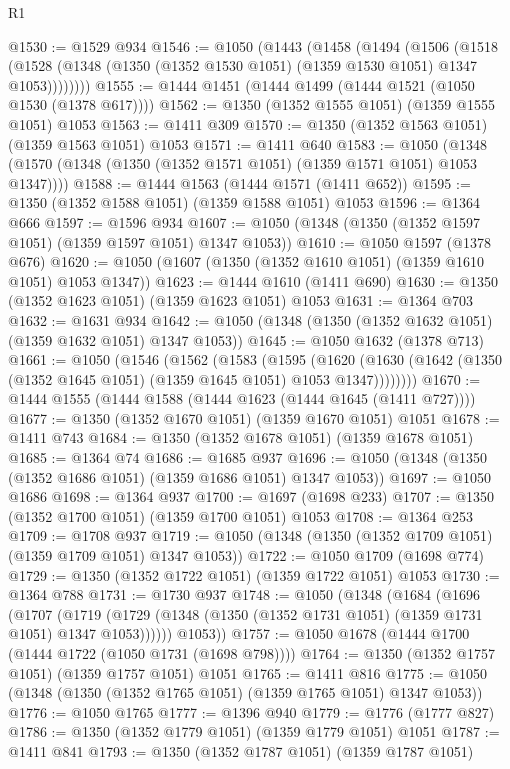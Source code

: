 \begin{lexlean}{R1}
\begin{coremodule}
@1530 := @1529 @934
@1546 := @1050
    (@1443
      (@1458
        (@1494
          (@1506
            (@1518 (@1528 (@1348 (@1350 (@1352 @1530 @1051) (@1359 @1530 @1051) @1347 @1053))))))))
@1555 := @1444 @1451 (@1444 @1499 (@1444 @1521 (@1050 @1530 (@1378 @617))))
@1562 := @1350 (@1352 @1555 @1051) (@1359 @1555 @1051) @1053
@1563 := @1411 @309
@1570 := @1350 (@1352 @1563 @1051) (@1359 @1563 @1051) @1053
@1571 := @1411 @640
@1583 := @1050 (@1348 (@1570 (@1348 (@1350 (@1352 @1571 @1051) (@1359 @1571 @1051) @1053 @1347))))
@1588 := @1444 @1563 (@1444 @1571 (@1411 @652))
@1595 := @1350 (@1352 @1588 @1051) (@1359 @1588 @1051) @1053
@1596 := @1364 @666
@1597 := @1596 @934
@1607 := @1050 (@1348 (@1350 (@1352 @1597 @1051) (@1359 @1597 @1051) @1347 @1053))
@1610 := @1050 @1597 (@1378 @676)
@1620 := @1050 (@1607 (@1350 (@1352 @1610 @1051) (@1359 @1610 @1051) @1053 @1347))
@1623 := @1444 @1610 (@1411 @690)
@1630 := @1350 (@1352 @1623 @1051) (@1359 @1623 @1051) @1053
@1631 := @1364 @703
@1632 := @1631 @934
@1642 := @1050 (@1348 (@1350 (@1352 @1632 @1051) (@1359 @1632 @1051) @1347 @1053))
@1645 := @1050 @1632 (@1378 @713)
@1661 := @1050
    (@1546
      (@1562
        (@1583
          (@1595
            (@1620 (@1630 (@1642 (@1350 (@1352 @1645 @1051) (@1359 @1645 @1051) @1053 @1347))))))))
@1670 := @1444 @1555 (@1444 @1588 (@1444 @1623 (@1444 @1645 (@1411 @727))))
@1677 := @1350 (@1352 @1670 @1051) (@1359 @1670 @1051) @1051
@1678 := @1411 @743
@1684 := @1350 (@1352 @1678 @1051) (@1359 @1678 @1051)
@1685 := @1364 @74
@1686 := @1685 @937
@1696 := @1050 (@1348 (@1350 (@1352 @1686 @1051) (@1359 @1686 @1051) @1347 @1053))
@1697 := @1050 @1686
@1698 := @1364 @937
@1700 := @1697 (@1698 @233)
@1707 := @1350 (@1352 @1700 @1051) (@1359 @1700 @1051) @1053
@1708 := @1364 @253
@1709 := @1708 @937
@1719 := @1050 (@1348 (@1350 (@1352 @1709 @1051) (@1359 @1709 @1051) @1347 @1053))
@1722 := @1050 @1709 (@1698 @774)
@1729 := @1350 (@1352 @1722 @1051) (@1359 @1722 @1051) @1053
@1730 := @1364 @788
@1731 := @1730 @937
@1748 := @1050
    (@1348
      (@1684
        (@1696
          (@1707
            (@1719 (@1729 (@1348 (@1350 (@1352 @1731 @1051) (@1359 @1731 @1051) @1347 @1053))))))
        @1053))
@1757 := @1050 @1678 (@1444 @1700 (@1444 @1722 (@1050 @1731 (@1698 @798))))
@1764 := @1350 (@1352 @1757 @1051) (@1359 @1757 @1051) @1051
@1765 := @1411 @816
@1775 := @1050 (@1348 (@1350 (@1352 @1765 @1051) (@1359 @1765 @1051) @1347 @1053))
@1776 := @1050 @1765
@1777 := @1396 @940
@1779 := @1776 (@1777 @827)
@1786 := @1350 (@1352 @1779 @1051) (@1359 @1779 @1051) @1051
@1787 := @1411 @841
@1793 := @1350 (@1352 @1787 @1051) (@1359 @1787 @1051)

\end{coremodule}
\end{lexlean}
